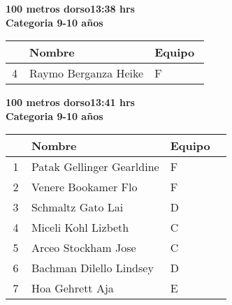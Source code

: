 \begin{minipage}{0.95\linewidth}\vspace{0.5cm} 
\begin{flushleft}
\textbf{
\hspace{-0.15cm}100 metros dorso\hspace{1.5cm}13:38 hrs \\Categoria 9-10 años}\vspace{-0.2cm} 
\end{flushleft}
\begin{tabular}{cp{0.63\linewidth}l}
\hline
& \textbf{Nombre} & \textbf{Equipo} \\ \hline
4 & Raymo Berganza Heike & F \\ 
\end{tabular}
\end{minipage}
\begin{minipage}{0.95\linewidth}\vspace{0.5cm} 
\begin{flushleft}
\textbf{
\hspace{-0.15cm}100 metros dorso\hspace{1.5cm}13:41 hrs \\Categoria 9-10 años}\vspace{-0.2cm} 
\end{flushleft}
\begin{tabular}{cp{0.63\linewidth}l}
\hline
& \textbf{Nombre} & \textbf{Equipo} \\ \hline
1 & Patak Gellinger Gearldine & F \\ 
2 & Venere Bookamer Flo & F \\ 
3 & Schmaltz Gato Lai & D \\ 
4 & Miceli Kohl Lizbeth & C \\ 
5 & Arceo Stockham Jose & C \\ 
6 & Bachman Dilello Lindsey & D \\ 
7 & Hoa Gehrett Aja & E \\ 
\end{tabular}
\end{minipage}
